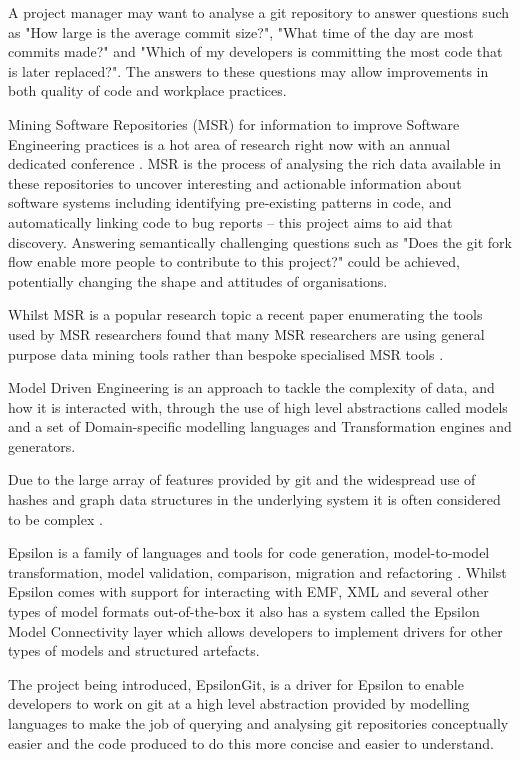 \documentclass[runningheads,a4paper]{llncs}
\begin{document}
A project manager may want to analyse a git repository to answer questions such as "How large is the average commit size?", "What time of the day are most commits made?" and "Which of my developers is committing the most code that is later replaced?". The answers to these questions may allow improvements in both quality of code and workplace practices.

Mining Software Repositories (MSR) for information to improve Software Engineering practices is a hot area of research right now with an annual dedicated conference \cite{msr2015}. MSR is the process of analysing the rich data available in these repositories to uncover interesting and actionable information about software systems \cite{theroadagainformsr} including identifying pre-existing patterns in code, and automatically linking code to bug reports -- this project aims to aid that discovery. Answering semantically challenging questions such as "Does the git fork flow enable more people to contribute to this project?" could be achieved, potentially changing the shape and attitudes of organisations.

Whilst MSR is a popular research topic a recent paper enumerating the tools used by MSR researchers found that many MSR researchers are using general purpose data mining tools rather than bespoke specialised MSR tools \cite{toolsinminingsoftwarerepositories}.

Model Driven Engineering is an approach to tackle the complexity of data, and how it is interacted with, through the use of high level abstractions called models \cite{modeldrivenengineering} and a set of Domain-specific modelling languages and Transformation engines and generators.   
	
Due to the large array of features provided by git and the widespread use of hashes and graph data structures in the underlying system it is often considered to be complex \cite{gitcomplex}\cite{githard}\cite{gitmixedmetaphors}.

Epsilon is a family of languages and tools for code generation, model-to-model transformation, model validation, comparison, migration and refactoring \cite{epsilonhomepage}. Whilst Epsilon comes with support for interacting with EMF, XML and several other types of model formats out-of-the-box it also has a system called the Epsilon Model Connectivity layer which allows developers to implement drivers for other types of models and structured artefacts.

The project being introduced, EpsilonGit, is a driver for Epsilon to enable developers to work on git at a high level abstraction provided by modelling languages to make the job of querying and analysing git repositories conceptually easier and the code produced to do this more concise and easier to understand.  
\end{document}
